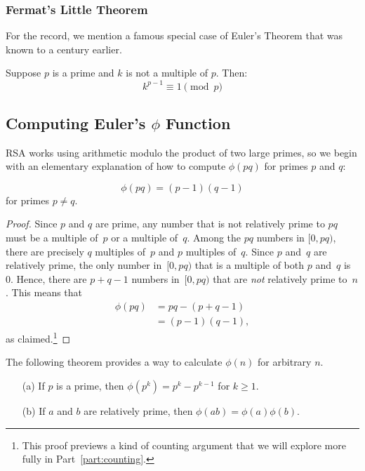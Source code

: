 \subsubsection{Fermat's Little Theorem}

For the record, we mention a famous special case of Euler's Theorem
that was known to  a century
earlier.

\begin{corollary}\label{fermat_little}
Suppose $p$ is a prime and $k$ is not a multiple of $p$.  Then:
\[
k^{p-1} \equiv 1 \pmod{p}
\]
\end{corollary}

\subsection{Computing Euler's $\phi$ Function}

RSA works using arithmetic modulo the product of two large primes, so we begin with an
elementary explanation of how to compute $\phi(pq)$ for primes $p$ and $q$:

\begin{lemma}\label{phi_pq}    %
\[
\phi(pq) = (p-1) (q-1)
\]
for primes $p\neq q$.
\end{lemma}

\begin{proof}
Since $p$ and $q$ are prime, any number that is not relatively prime to $pq$ must be a
multiple of~$p$ or a multiple of~$q$.  Among the $pq$ numbers in $[0, pq)$, there are
  precisely $q$ multiples of~$p$ and $p$ multiples of~$q$.  Since $p$ and~$q$ are
  relatively prime, the only number in~$[0, pq)$ that is a multiple of both $p$ and~$q$ is
    0.  Hence, there are $p + q - 1$ numbers in~$[0, pq)$ that are \emph{not} relatively
      prime to~$n$.  This means that
\begin{align*}
    \phi(pq) & = pq - (p + q - 1) \\
& = (p - 1) (q - 1),
\end{align*}
as claimed.\footnote{This proof previews a kind of counting argument that we will explore
  more fully in Part~\ref{part:counting}.}
\end{proof}

The following theorem provides a way to calculate $\phi(n)$ for arbitrary $n$.
\begin{theorem}\label{th:phi}\mbox{}
\begin{enumerate}
\item[(a)] If $p$ is a prime, then $\phi(p^k) = p^k - p^{k-1}$ for $k \geq 1$.
\item[(b)] If $a$ and $b$ are relatively prime, then $\phi(ab) = \phi(a)\phi(b)$.
\end{enumerate}
\end{theorem}

